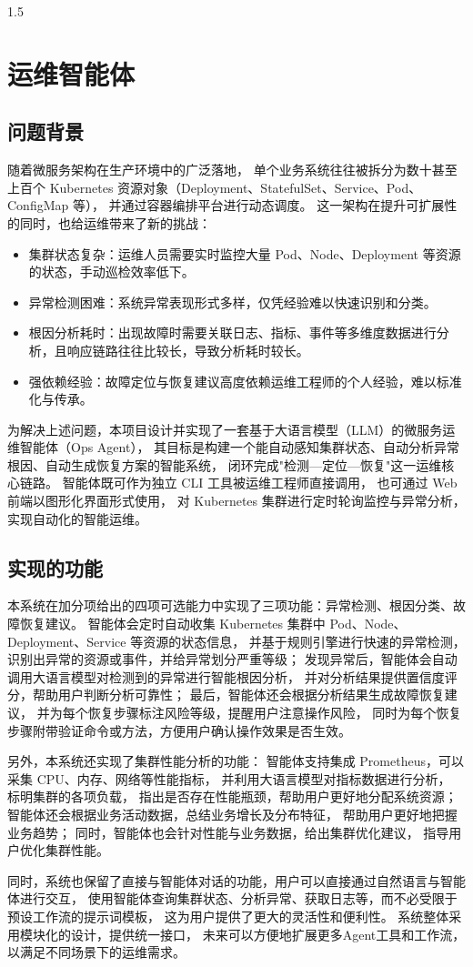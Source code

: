 \documentclass[a4paper,12pt]{report}
\begin{document}
\begin{spacing}{1.5}
\section{运维智能体}
\subsection{问题背景}
随着微服务架构在生产环境中的广泛落地，
单个业务系统往往被拆分为数十甚至上百个 Kubernetes 资源对象（Deployment、StatefulSet、Service、Pod、ConfigMap 等），
并通过容器编排平台进行动态调度。
这一架构在提升可扩展性的同时，也给运维带来了新的挑战：
\begin{itemize}
	\item 集群状态复杂：运维人员需要实时监控大量 Pod、Node、Deployment 等资源的状态，手动巡检效率低下。
	\item 异常检测困难：系统异常表现形式多样，仅凭经验难以快速识别和分类。
	\item 根因分析耗时：出现故障时需要关联日志、指标、事件等多维度数据进行分析，且响应链路往往比较长，导致分析耗时较长。
	\item 强依赖经验：故障定位与恢复建议高度依赖运维工程师的个人经验，难以标准化与传承。
\end{itemize}
\par
为解决上述问题，本项目设计并实现了一套基于大语言模型（LLM）的微服务运维智能体（Ops Agent），
其目标是构建一个能自动感知集群状态、自动分析异常根因、自动生成恢复方案的智能系统，
闭环完成"检测—定位—恢复"这一运维核心链路。
智能体既可作为独立 CLI 工具被运维工程师直接调用，
也可通过 Web 前端以图形化界面形式使用，
对 Kubernetes 集群进行定时轮询监控与异常分析，
实现自动化的智能运维。

\subsection{实现的功能}
本系统在加分项给出的四项可选能力中实现了三项功能：异常检测、根因分类、故障恢复建议。
智能体会定时自动收集 Kubernetes 集群中 Pod、Node、Deployment、Service 等资源的状态信息，
并基于规则引擎进行快速的异常检测，
识别出异常的资源或事件，并给异常划分严重等级；
发现异常后，智能体会自动调用大语言模型对检测到的异常进行智能根因分析，
并对分析结果提供置信度评分，帮助用户判断分析可靠性；
最后，智能体还会根据分析结果生成故障恢复建议，
并为每个恢复步骤标注风险等级，提醒用户注意操作风险，
同时为每个恢复步骤附带验证命令或方法，方便用户确认操作效果是否生效。
\par
另外，本系统还实现了集群性能分析的功能：
智能体支持集成 Prometheus，可以采集 CPU、内存、网络等性能指标，
并利用大语言模型对指标数据进行分析，
标明集群的各项负载，
指出是否存在性能瓶颈，帮助用户更好地分配系统资源；
智能体还会根据业务活动数据，总结业务增长及分布特征，
帮助用户更好地把握业务趋势；
同时，智能体也会针对性能与业务数据，给出集群优化建议，
指导用户优化集群性能。
\par
同时，系统也保留了直接与智能体对话的功能，用户可以直接通过自然语言与智能体进行交互，
使用智能体查询集群状态、分析异常、获取日志等，而不必受限于预设工作流的提示词模板，
这为用户提供了更大的灵活性和便利性。
系统整体采用模块化的设计，提供统一接口，
未来可以方便地扩展更多Agent工具和工作流，
以满足不同场景下的运维需求。


\end{spacing}
\end{document}
